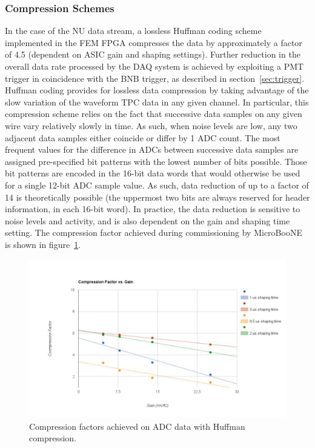 

\subsubsection{Compression Schemes}
\label{sec:tpccomp}

In the case of the NU data stream, a lossless Huffman coding scheme implemented in the FEM FPGA compresses the data by approximately a factor of 4.5 (dependent on ASIC gain and shaping settings). Further reduction in the overall data rate processed by the DAQ system is achieved by exploiting a PMT trigger in coincidence with the BNB trigger, as described in section~\ref{sec:trigger}. Huffman coding provides for lossless data compression by taking advantage of the slow variation of the waveform TPC data in any given channel. In particular, this compression scheme relies on the fact that successive data samples on any given wire vary relatively slowly in time. As such, when noise levels are low, any two adjacent data samples either coincide or differ by 1 ADC count. The most frequent values for the difference in ADCs between successive data samples are assigned pre-specified bit patterns with the lowest number of bits possible. Those bit patterns are encoded in the 16-bit data words that would otherwise be used for a single 12-bit ADC sample value. As such, data reduction of up to a factor of 14 is theoretically possible (the uppermost two bits are always reserved for header information, in each 16-bit word). In practice, the data reduction is sensitive to noise levels and \lartpc activity, and is also dependent on the gain and shaping time setting. The compression factor achieved during commissioning by MicroBooNE is shown in figure~\ref{fig:readout_6}.

\begin{figure}
\centering
\includegraphics[width=0.8\linewidth]{./figures/readout_6.jpg}%
\caption{\label{fig:readout_6}Compression factors achieved on ADC data with Huffman compression.}
\end{figure}

